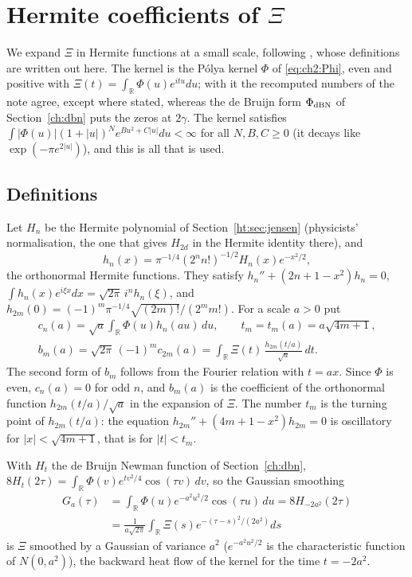 \section{Hermite coefficients of $\Xi$}\label{tr:sec:hermite}

We expand $\Xi$ in Hermite functions at a small scale, following \cite{P26hermite}, whose definitions are written out here. The kernel is the P\'olya kernel $\Phi$ of \eqref{eq:ch2:Phi}, even and positive with $\Xi(t)=\int_{\mathbb R}\Phi(u)e^{itu}du$; with it the recomputed numbers of the note agree, except where stated, whereas the de Bruijn form $\Phi_{\rm dBN}$ of Section~\ref{ch:dbn} puts the zeros at $2\gamma$. The kernel satisfies $\int|\Phi(u)|(1+|u|)^Ne^{Bu^2+C|u|}du<\infty$ for all $N,B,C\ge0$ (it decays like $\exp(-\pi e^{2|u|})$), and this is all that is used.

\subsection{Definitions}

Let $H_n$ be the Hermite polynomial of Section~\ref{ht:sec:jensen} (physicists' normalisation, the one that gives $H_{2d}$ in the Hermite identity there), and
\[
h_n(x)=\pi^{-1/4}(2^nn!)^{-1/2}H_n(x)e^{-x^2/2},
\]
the orthonormal Hermite functions. They satisfy $h_n''+(2n+1-x^2)h_n=0$, $\int h_n(x)e^{i\xi x}dx=\sqrt{2\pi}\,i^nh_n(\xi)$, and $h_{2m}(0)=(-1)^m\pi^{-1/4}\sqrt{(2m)!}/(2^mm!)$. For a scale $a>0$ put
\begin{gather*}
c_n(a)=\sqrt a\int_{\mathbb R}\Phi(u)h_n(au)\,du,\qquad t_m=t_m(a)=a\sqrt{4m+1},\\
b_m(a)=\sqrt{2\pi}\,(-1)^mc_{2m}(a)=\int_{\mathbb R}\Xi(t)\,\frac{h_{2m}(t/a)}{\sqrt a}\,dt.
\end{gather*}
The second form of $b_m$ follows from the Fourier relation with $t=ax$. Since $\Phi$ is even, $c_n(a)=0$ for odd $n$, and $b_m(a)$ is the coefficient of the orthonormal function $h_{2m}(t/a)/\sqrt a$ in the expansion of $\Xi$. The number $t_m$ is the turning point of $h_{2m}(t/a)$: the equation $h_{2m}''+(4m+1-x^2)h_{2m}=0$ is oscillatory for $|x|<\sqrt{4m+1}$, that is for $|t|<t_m$.

With $H_t$ the de Bruijn Newman function of Section~\ref{ch:dbn}, $8H_t(2\tau)=\int_{\mathbb R}\Phi(v)e^{tv^2/4}\cos(\tau v)\,dv$, so the Gaussian smoothing
\[
\begin{aligned}G_a(\tau)&=\int_{\mathbb R}\Phi(u)e^{-a^2u^2/2}\cos(\tau u)\,du=8H_{-2a^2}(2\tau)\\&=\frac1{a\sqrt{2\pi}}\int_{\mathbb R}\Xi(s)e^{-(\tau-s)^2/(2a^2)}ds\end{aligned}
\]
is $\Xi$ smoothed by a Gaussian of variance $a^2$ ($e^{-a^2u^2/2}$ is the characteristic function of $N(0,a^2)$), the backward heat flow of the kernel for the time $t=-2a^2$.

